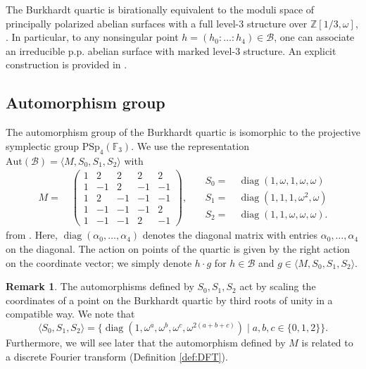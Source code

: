 \documentclass[11pt]{amsart}
\theoremstyle{definition}
\newtheorem{remark}[theorem]{Remark}
\newcommand{\B}{\mathcal{B}}
\newcommand{\Aut}{\text{Aut}}
\newcommand{\PSp}{\text{PSp}}
\newcommand{\FF}{\mathbb{F}}
\newcommand{\ZZ}{\mathbb{Z}}
\newcommand{\diag}{\mathop{diag}}
\begin{document}
The Burkhardt quartic is birationally equivalent to the moduli space of principally polarized abelian surfaces with a full level-$3$ structure  over $\ZZ[1/3, \omega]$, \cite{van1987note}. In particular, to any nonsingular point $h=(h_0: \dots: h_4) \in \B$, one can associate an irreducible p.p. abelian surface with marked level-$3$ structure. An explicit construction is provided in \cite{bruin2018arithmetic}. 

\subsection{Automorphism group} The automorphism group of the Burkhardt quartic is isomorphic to the projective symplectic group $\PSp_4(\FF_3)$. We use the representation $\Aut(\B)  = \langle M, S_0,S_1,S_2\rangle$ with
\begin{equation}
	\label{eq:automorphisms}
	\begin{aligned}
	M =&~ \begin{pmatrix}
		1 & 2 & 2 & 2 & 2 \\
		1 & -1 & 2 & -1 & -1 \\
		1 & 2 & -1 & -1 & -1 \\
		1 & -1 & -1 & -1 & 2 \\
		1 & -1 & -1 & 2 & -1
	\end{pmatrix},
	\end{aligned}
	\quad 
	\begin{aligned}
	S_0 =&~ \diag(1,\omega,1,\omega, \omega)\\
	S_1 =&~ \diag(1,1,1,\omega^2, \omega)\\
	S_2 =&~ \diag(1,1,\omega,\omega, \omega).
	\end{aligned}
\end{equation}
from \cite[Proposition 1]{freitag2004burkhardt1}. Here, $\diag(\alpha_0, \dots, \alpha_4)$ denotes the diagonal matrix with entries $\alpha_0, \dots, \alpha_4$ on the diagonal. The action on points of the quartic is given by the right action on the coordinate vector; we simply denote $h \cdot g$ for $h \in \B$ and $g \in \langle M, S_0,S_1,S_2\rangle$.

\begin{remark}
    The automorphisms defined by $S_0,S_1,S_2$ act by scaling the coordinates of a point on the Burkhardt quartic by third roots of unity in a compatible way. We note that
    \[
    \langle S_0,S_1,S_2 \rangle = \{\diag(1,\omega^a, \omega^b, \omega^c, \omega^{2(a + b + c)}) \mid a,b,c \in \{0,1,2\} \}.
    \]
    Furthermore, we will see later that the automorphism defined by $M$ is related to a discrete Fourier transform (Definition \ref{def:DFT}).
\end{remark}
\end{document}
